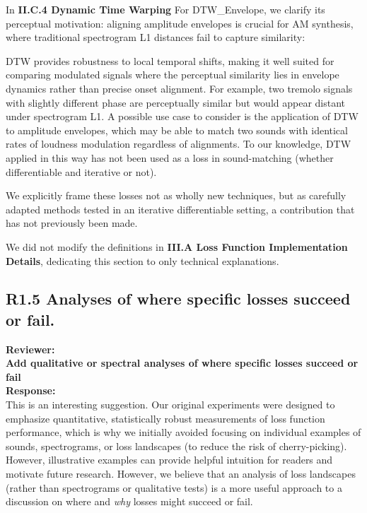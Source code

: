 \documentclass[11pt]{article}
\begin{document}
 In \textbf{II.C.4 Dynamic Time Warping} For DTW\_Envelope, we clarify its perceptual motivation: aligning amplitude envelopes is crucial for AM synthesis, where traditional spectrogram L1 distances fail to capture similarity: 
 \begin{displayquote}
     DTW provides robustness to local temporal shifts, making it well suited for comparing modulated signals where the perceptual similarity lies in envelope dynamics rather than precise onset alignment. 
    For example, two tremolo signals with slightly different phase are perceptually similar but would appear distant under spectrogram L1. 
    A possible use case to consider is the application of DTW to amplitude envelopes, which may be able to match two sounds with identical rates of loudness modulation regardless of alignments. 
    To our knowledge, DTW applied in this way has not been used as a loss in sound-matching (whether differentiable and iterative or not).
 \end{displayquote}
 
 We explicitly frame these losses not as wholly new techniques, but as carefully adapted methods tested in an iterative differentiable setting, a contribution that has not previously been made.  

We did not modify the definitions in \textbf{III.A Loss Function Implementation Details}, dedicating this section to only technical explanations. 

\subsection*{R1.5 Analyses of where specific losses succeed or fail.}
\label{R1.5}
\noindent\textbf{Reviewer:} \\
\textbf{Add qualitative or spectral analyses of where specific losses succeed or fail}\\

\noindent\textbf{Response:} \\
This is an interesting suggestion. Our original experiments were designed to emphasize quantitative, statistically robust measurements of loss function performance, which is why we initially avoided focusing on individual examples of sounds, spectrograms, or loss landscapes (to reduce the risk of cherry-picking). However, illustrative examples can provide helpful intuition for readers and motivate future research. However, we believe that an analysis of loss landscapes (rather than spectrograms or qualitative tests) is a more useful approach to a discussion on where and \textit{why} losses might succeed or fail.
\end{document}
